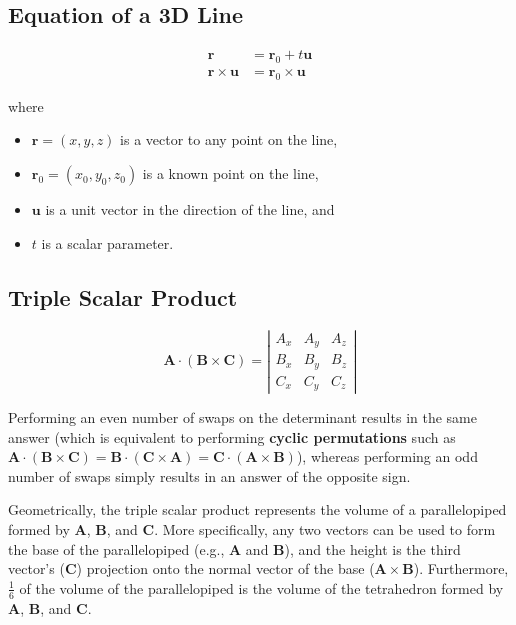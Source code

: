 \subsection{Equation of a 3D Line}

\begin{align*}
    \mathbf{r}                   & = \mathbf{r}_0 + t\mathbf{u}
    \\
    \mathbf{r} \times \mathbf{u} & = \mathbf{r}_0 \times \mathbf{u}
\end{align*}

where
\begin{itemize}
    \item $\mathbf{r} = (x, y, z)$ is a vector to any point on the line,
    \item $\mathbf{r}_0 = (x_0, y_0, z_0)$ is a known point on the line,
    \item $\mathbf{u}$ is a unit vector in the direction of the line, and
    \item $t$ is a scalar parameter.
\end{itemize}

\subsection{Triple Scalar Product}
\begin{equation*}
    \mathbf{A}\cdot(\mathbf{B} \times \mathbf{C}) =
    \left|\begin{matrix}
        A_x & A_y & A_z \\
        B_x & B_y & B_z \\
        C_x & C_y & C_z
    \end{matrix}\right|
\end{equation*}

Performing an even number of swaps on the determinant results in the same answer (which is equivalent to performing \textbf{cyclic permutations} such as $\mathbf{A}\cdot(\mathbf{B}\times\mathbf{C}) = \mathbf{B}\cdot(\mathbf{C}\times\mathbf{A}) = \mathbf{C}\cdot(\mathbf{A}\times\mathbf{B})$), whereas performing an odd number of swaps simply results in an answer of the opposite sign.

Geometrically, the triple scalar product represents the volume of a parallelopiped formed by $\mathbf{A}$, $\mathbf{B}$, and $\mathbf{C}$. More specifically, any two vectors can be used to form the base of the parallelopiped (e.g., $\mathbf{A}$ and $\mathbf{B}$), and the height is the third vector's ($\mathbf{C}$) projection onto the normal vector of the base ($\mathbf{A} \times \mathbf{B}$). Furthermore, $\frac{1}{6}$ of the volume of the parallelopiped is the volume of the tetrahedron formed by $\mathbf{A}$, $\mathbf{B}$, and $\mathbf{C}$.
